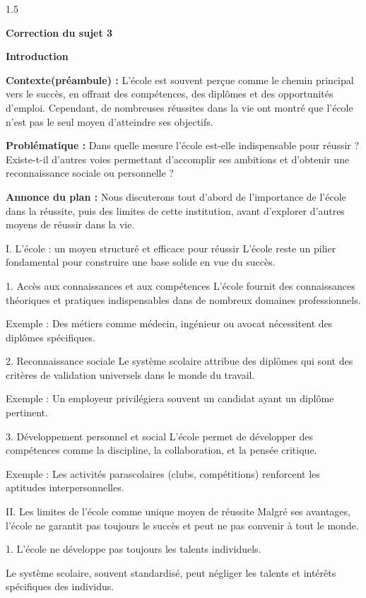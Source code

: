 \documentclass[12pt]{article}
\begin{document}
\begin{spacing}{1.5}
\quad

\textbf{Correction du sujet 3}

\textbf{ Introduction}

\textbf{Contexte(préambule) :} L'école est souvent perçue comme le chemin principal vers le succès, en offrant des compétences, des diplômes et des opportunités d'emploi. Cependant, de nombreuses réussites dans la vie ont montré que l'école n'est pas le seul moyen d'atteindre ses objectifs.

\textbf{ Problématique :} Dans quelle mesure l'école est-elle indispensable pour réussir ? Existe-t-il d'autres voies permettant d'accomplir ses ambitions et d'obtenir une reconnaissance sociale ou personnelle ?

\textbf{ Annonce du plan :} Nous discuterons tout d'abord de l'importance de l'école dans la réussite, puis des limites de cette institution, avant d'explorer d'autres moyens de réussir dans la vie.

\quad
I. L'école : un moyen structuré et efficace pour réussir
L'école reste un pilier fondamental pour construire une base solide en vue du succès.

1. Accès aux connaissances et aux compétences
L'école fournit des connaissances théoriques et pratiques indispensables dans de nombreux domaines professionnels.

Exemple : Des métiers comme médecin, ingénieur ou avocat nécessitent des diplômes spécifiques.

2. Reconnaissance sociale
Le système scolaire attribue des diplômes qui sont des critères de validation universels dans le monde du travail.

Exemple : Un employeur privilégiera souvent un candidat ayant un diplôme pertinent.

3. Développement personnel et social
L'école permet de développer des compétences comme la discipline, la collaboration, et la pensée critique.

Exemple : Les activités parascolaires (clubs, compétitions) renforcent les aptitudes interpersonnelles.

\quad
II. Les limites de l'école comme unique moyen de réussite
Malgré ses avantages, l'école ne garantit pas toujours le succès et peut ne pas convenir à tout le monde.

1. L'école ne développe pas toujours les talents individuels.

Le système scolaire, souvent standardisé, peut négliger les talents et intérêts spécifiques des individus.


\end{spacing}
\end{document}
